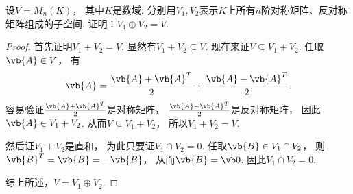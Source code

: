 \begin{example}
设\(V=M_n(K)\)，
其中\(K\)是数域.
分别用\(V_1,V_2\)表示\(K\)上所有\(n\)阶对称矩阵、反对称矩阵组成的子空间.
证明：\(V_1\oplus V_2=V\).
\begin{proof}
首先证明\(V_1+V_2=V\).
显然有\(V_1+V_2\subseteq V\).
现在来证\(V\subseteq V_1+V_2\).
任取\(\vb{A}\in V\)，
有\[
	\vb{A}=\frac{\vb{A}+\vb{A}^T}2+\frac{\vb{A}-\vb{A}^T}2.
\]
容易验证\(\frac{\vb{A}+\vb{A}^T}2\)是对称矩阵，
\(\frac{\vb{A}-\vb{A}^T}2\)是反对称矩阵，
因此\(\vb{A}\in V_1+V_2\).
从而\(V\subseteq V_1+V_2\)，
所以\(V_1+V_2=V\).

然后证\(V_1+V_2\)是直和，
为此只要证\(V_1 \cap V_2=0\).
任取\(\vb{B} \in V_1 \cap V_2\)，
则\(\vb{B}^T = \vb{B} = -\vb{B}\)，
从而\(\vb{B} = \vb0\).
因此\(V_1 \cap V_2=0\).

综上所述，\(V=V_1\oplus V_2\).
\end{proof}
\end{example}
